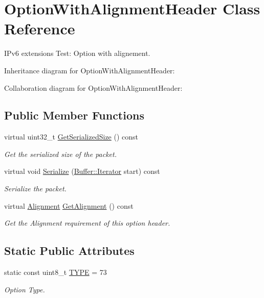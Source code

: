 \hypertarget{classOptionWithAlignmentHeader}{}\section{Option\+With\+Alignment\+Header Class Reference}
\label{classOptionWithAlignmentHeader}


I\+Pv6 extensions Test\+: Option with alignement.  




Inheritance diagram for Option\+With\+Alignment\+Header\+:


Collaboration diagram for Option\+With\+Alignment\+Header\+:
\subsection*{Public Member Functions}
\begin{DoxyCompactItemize}
\item 
virtual uint32\+\_\+t \hyperlink{classOptionWithAlignmentHeader_a33579630e52088259561d88b312fbd03}{Get\+Serialized\+Size} () const 
\begin{DoxyCompactList}\small\item\em Get the serialized size of the packet. \end{DoxyCompactList}\item 
virtual void \hyperlink{classOptionWithAlignmentHeader_a8b2bc3909f9e89b600a2efe43aa3c0ce}{Serialize} (\hyperlink{classns3_1_1Buffer_1_1Iterator}{Buffer\+::\+Iterator} start) const 
\begin{DoxyCompactList}\small\item\em Serialize the packet. \end{DoxyCompactList}\item 
virtual \hyperlink{structns3_1_1Ipv6OptionHeader_1_1Alignment}{Alignment} \hyperlink{classOptionWithAlignmentHeader_a8525680e0e3507420a3ed79e1a07e3bc}{Get\+Alignment} () const 
\begin{DoxyCompactList}\small\item\em Get the Alignment requirement of this option header. \end{DoxyCompactList}\end{DoxyCompactItemize}
\subsection*{Static Public Attributes}
\begin{DoxyCompactItemize}
\item 
static const uint8\+\_\+t \hyperlink{classOptionWithAlignmentHeader_a196dd8d16dd06cbab2c11a818083f684}{T\+Y\+PE} = 73
\begin{DoxyCompactList}\small\item\em Option Type. \end{DoxyCompactList}\end{DoxyCompactItemize}
